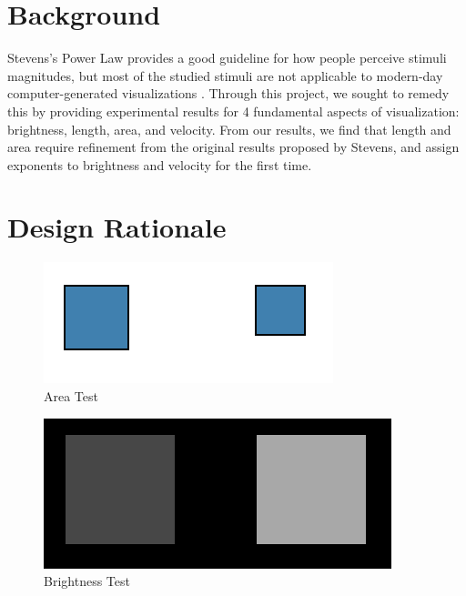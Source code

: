 \documentclass{article}
\begin{document}
\begin{multicols}{2}
\section{Background}
Stevens's Power Law provides a good guideline for how people perceive stimuli magnitudes, but most of the studied stimuli are not applicable to modern-day computer-generated visualizations \cite{bolton2008modeling}. Through this project, we sought to remedy this by providing experimental results for 4 fundamental aspects of visualization: brightness, length, area, and velocity. From our results, we find that length and area require refinement from the original results proposed by Stevens, and assign exponents to brightness and velocity for the first time. \cite{bauer2009does}

\section{Design Rationale}
\begin{figure}[H]
    \centering
    \includegraphics[width=\columnwidth]{Area}
    \caption{Area Test}
    \label{fig:Area}
\end{figure}

\begin{figure}[H]
    \centering
    \includegraphics[width=\columnwidth]{Brightness}
    \caption{Brightness Test}
    \label{fig:Brightness}
\end{figure}


\end{multicols}
\end{document}

